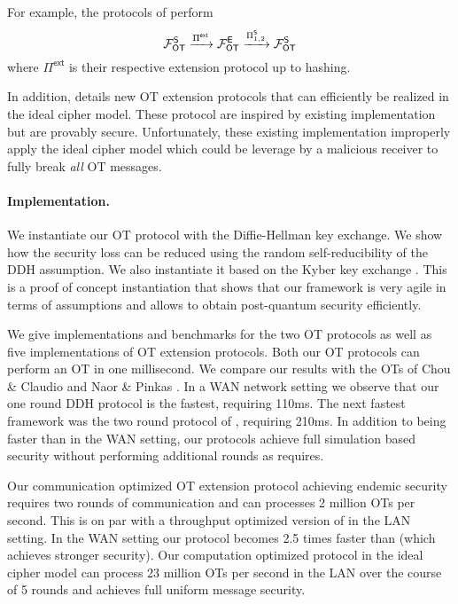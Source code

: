 \iffullversion
For example, the protocols of \cite{C:IKNP03,EC:ALSZ15,C:KelOrsSch15} perform
$$
\mathcal{F}_{\mathsf{OT}}^\mathsf{S} \xrightarrow{\Pi^{\textsf{ext}}} \mathcal{F}_{\mathsf{OT}}^\mathsf{E} \xrightarrow{\Pi^{\mathsf{S}}_{1,2}} \mathcal{F}_{\mathsf{OT}}^\mathsf{S}
$$
where $\Pi^\textsf{ext}$ is their respective extension protocol up to hashing.
\fi

In addition,  details new OT extension protocols that can efficiently be realized in the ideal cipher model. These protocol are inspired by existing implementation \cite{libOTe,KOS,EMP} but are provably secure. Unfortunately, these existing implementation improperly apply the ideal cipher model which could be leverage by a malicious receiver to fully break \emph{all} OT messages. 


\paragraph{Implementation.} We instantiate our OT protocol with the Diffie-Hellman key exchange. We show how the security loss can be reduced using the random self-reducibility of the DDH assumption. 
We also instantiate it based on the Kyber key exchange \cite{EPRINT:BDKLLS17,NISTPQC-R1:CRYSTALS-KYBER17}. This is a proof of concept instantiation that shows that our framework is very agile in terms of assumptions and allows to obtain post-quantum security efficiently. 

We give implementations and benchmarks for the two OT protocols as well as five implementations of OT extension protocols. Both our OT protocols can perform an OT in one millisecond. We compare our results with the OTs of Chou \& Claudio \cite{LC:ChoOrl15} and Naor \& Pinkas \cite{SODA:NaoPin01}. In a WAN network setting we observe that our one round DDH protocol is the fastest, requiring 110ms. The next fastest framework was the two round protocol of \cite{LC:ChoOrl15}, requiring 210ms. In addition to being faster than \cite{LC:ChoOrl15} in the WAN setting, our protocols achieve full simulation based security without performing additional rounds as \cite{LC:ChoOrl15} requires. 

Our communication optimized OT extension protocol achieving endemic security requires two rounds of communication and can processes 2 million OTs per second. This is on par with a throughput optimized version of \cite{C:KelOrsSch15,libOTe} in the LAN setting. In the WAN setting our protocol becomes 2.5 times faster than \cite{C:KelOrsSch15} (which achieves stronger security). Our computation optimized protocol in the ideal cipher model can process 23 million OTs per second in the LAN over the course of 5 rounds and achieves full uniform message security.

